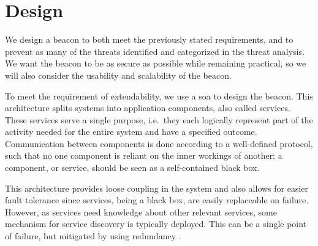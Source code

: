 \section{Design}\label{sec:design}


We design a beacon to both meet the previously stated requirements, and to prevent as many of the threats identified and categorized in the threat analysis. We want the beacon to be as secure as possible while remaining practical, so we will also consider the usability and scalability of the beacon.

To meet the requirement of extendability, we use a \gls{soa} to design the beacon.
This architecture splits systems into application components, also called services.
These services serve a single purpose, i.e.\ they each logically represent part of the activity needed for the entire system and have a specified outcome.
Communication between components is done according to a well-defined protocol, such that no one component is reliant on the inner workings of another;
a component, or service, should be seen as a self-contained black box.

This architecture provides loose coupling in the system and also allows for easier fault tolerance since services, being a black box, are easily replaceable on failure.
However, as services need knowledge about other relevant services, some mechanism for service discovery is typically deployed.
This can be a single point of failure, but mitigated by using redundancy \cite{soa_redundancy}.

